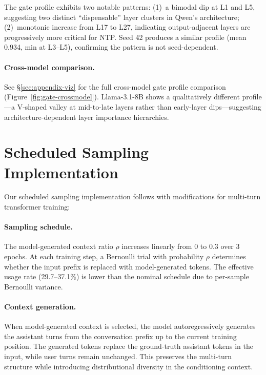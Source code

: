 The gate profile exhibits two notable patterns: (1)~a bimodal dip at L1 and L5, suggesting two distinct ``dispensable'' layer clusters in Qwen's architecture; (2)~monotonic increase from L17 to L27, indicating output-adjacent layers are progressively more critical for NTP. Seed 42 produces a similar profile (mean 0.934, min at L3--L5), confirming the pattern is not seed-dependent.

\paragraph{Cross-model comparison.} See \S\ref{sec:appendix-viz} for the full cross-model gate profile comparison (Figure~\ref{fig:gate-crossmodel}). Llama-3.1-8B shows a qualitatively different profile---a V-shaped valley at mid-to-late layers rather than early-layer dips---suggesting architecture-dependent layer importance hierarchies.

\section{Scheduled Sampling Implementation}\label{sec:appendix-ss}

Our scheduled sampling implementation follows \citet{bengio2015scheduled} with modifications for multi-turn transformer training:

\paragraph{Sampling schedule.} The model-generated context ratio $\rho$ increases linearly from 0 to 0.3 over 3 epochs. At each training step, a Bernoulli trial with probability $\rho$ determines whether the input prefix is replaced with model-generated tokens. The effective usage rate (29.7--37.1\%) is lower than the nominal schedule due to per-sample Bernoulli variance.

\paragraph{Context generation.} When model-generated context is selected, the model autoregressively generates the assistant turns from the conversation prefix up to the current training position. The generated tokens replace the ground-truth assistant tokens in the input, while user turns remain unchanged. This preserves the multi-turn structure while introducing distributional diversity in the conditioning context.

